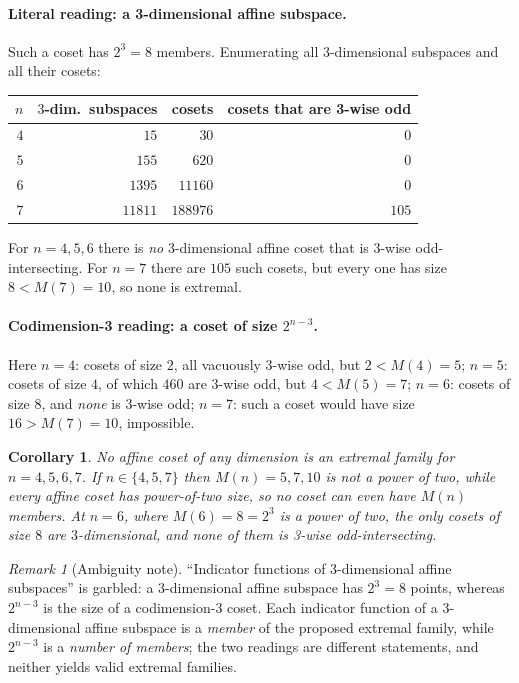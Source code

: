 \documentclass[11pt]{article}
\newtheorem{corollary}[theorem]{Corollary}
\theoremstyle{definition}
\theoremstyle{remark}
\newtheorem{remark}[theorem]{Remark}
\begin{document}
\paragraph{Literal reading: a 3-dimensional affine subspace.}
Such a coset has $2^3 = 8$ members. Enumerating all $3$-dimensional subspaces
and all their cosets:

\begin{center}
\begin{tabular}{r r r r}
\toprule
$n$ & $3$-dim.\ subspaces & cosets & cosets that are 3-wise odd \\
\midrule
$4$ & $15$   & $30$    & $0$ \\
$5$ & $155$  & $620$   & $0$ \\
$6$ & $1395$ & $11160$ & $0$ \\
$7$ & $11811$& $188976$& $105$ \\
\bottomrule
\end{tabular}
\end{center}

For $n = 4, 5, 6$ there is \emph{no} 3-dimensional affine coset that is
3-wise odd-intersecting. For $n = 7$ there are $105$ such cosets, but every one
has size $8 < M(7) = 10$, so none is extremal.

\paragraph{Codimension-3 reading: a coset of size $2^{n-3}$.}
Here $n = 4$: cosets of size $2$, all vacuously 3-wise odd, but $2 < M(4) = 5$;
$n = 5$: cosets of size $4$, of which $460$ are 3-wise odd, but
$4 < M(5) = 7$; $n = 6$: cosets of size $8$, and \emph{none} is 3-wise odd;
$n = 7$: such a coset would have size $16 > M(7) = 10$, impossible.

\begin{corollary}
No affine coset of any dimension is an extremal family for $n = 4, 5, 6, 7$. If
$n \in \{4,5,7\}$ then $M(n) = 5, 7, 10$ is not a power of two, while every
affine coset has power-of-two size, so no coset can even have $M(n)$ members. At
$n = 6$, where $M(6) = 8 = 2^3$ is a power of two, the only cosets of size $8$
are $3$-dimensional, and none of them is 3-wise odd-intersecting.
\end{corollary}

\begin{remark}[Ambiguity note]
``Indicator functions of 3-dimensional affine subspaces'' is garbled: a
3-dimensional affine subspace has $2^3 = 8$ points, whereas $2^{n-3}$ is the
size of a codimension-3 coset. Each indicator function of a 3-dimensional
affine subspace is a \emph{member} of the proposed extremal family, while
$2^{n-3}$ is a \emph{number of members}; the two readings are different
statements, and neither yields valid extremal families.
\end{remark}
\end{document}
